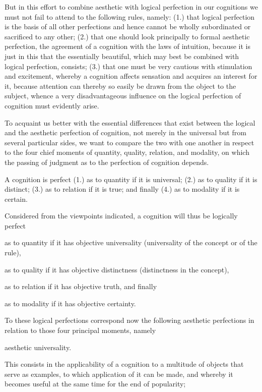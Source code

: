     But in this effort to combine aesthetic with logical perfection
    in our cognitions we must not fail to attend to the following rules, namely:
    (1.) that logical perfection is the basis of all other perfections
    and hence cannot be wholly subordinated or sacrificed to any other;
    (2.) that one should look principally to formal aesthetic perfection,
    the agreement of a cognition with the laws of intuition,
    because it is just in this that the essentially beautiful,
    which may best be combined with logical perfection, consists;
    (3.) that one must be very cautious with stimulation and excitement,
    whereby a cognition affects sensation and acquires an interest for it,
    because attention can thereby so easily be drawn
    from the object to the subject,
    whence a very disadvantageous influence
    on the logical perfection of cognition
    must evidently arise.

    To acquaint us better with the essential differences that exist between
    the logical and the aesthetic perfection of cognition,
    not merely in the universal but from several particular sides,
    we want to compare the two with one another in respect to
    the four chief moments of quantity, quality, relation, and modality,
    on which the passing of judgment as to the perfection of cognition depends.

    A cognition is perfect
    (1.) as to quantity if it is universal;
    (2.) as to quality if it is distinct;
    (3.) as to relation if it is true; and finally
    (4.) as to modality if it is certain.

    Considered from the viewpoints indicated,
    a cognition will thus be logically perfect

    as to quantity if it has objective universality
        (universality of the concept or of the rule),

    as to quality if it has objective distinctness
        (distinctness in the concept),

    as to relation if it has objective truth, and finally

    as to modality if it has objective certainty.

    To these logical perfections correspond now the following aesthetic
    perfections in relation to those four principal moments, namely

    aesthetic universality.

        This consists in the applicability of a cognition to
        a multitude of objects that serve as examples,
        to which application of it can be made,
        and whereby it becomes useful at the same time
        for the end of popularity;

